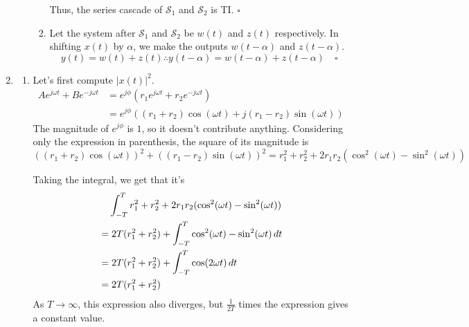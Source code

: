 \documentclass[12pt]{article}
\begin{document}
\begin{enumerate}
\begin{enumerate}
\begin{enumerate}
                                    Thus, the series cascade of $\mathcal{S}_1$ and $\mathcal{S}_2$ is TI. $\square$
                              \item Let the system after $\mathcal{S}_1$ and
                                    $\mathcal{S}_2$ be $w(t)$ and $z(t)$ respectively.
                                    In shifting $x(t)$ by $\alpha$, we make the outputs $w(t-\alpha)$ and $z(t-\alpha)$.
                                    \[y(t) = w(t) + z(t) \therefore y(t - \alpha) = w(t -\alpha) + z(t-\alpha)\quad\square\]
                        \end{enumerate}
            \end{enumerate}
      \item \begin{enumerate}
                  \item Let's first compute $|x(t)|^2$.
                        \begin{align*}
                              Ae^{j\omega t}+Be^{-j\omega t}
                               & = e^{j\phi}\left(r_1e^{j\omega t}+r_2e^{-j\omega t}\right)               \\
                               & = e^{j\phi}\left((r_1+r_2)\cos(\omega t)+j(r_1-r_2)\sin(\omega t)\right)
                        \end{align*}
                        The magnitude of $e^{j\phi}$ is $1$, so it doesn't contribute anything.
                        Considering only the expression in parenthesis,
                        the square of its magnitude is
                        \[((r_1+r_2)\cos(\omega t))^2+((r_1-r_2)\sin(\omega t))^2
                              = r_1^2+r_2^2 + 2r_1r_2(\cos^2(\omega t)-\sin^2(\omega t))\]

                        Taking the integral, we get that it's
                        \begin{align*}
                              &\hphantom{={}} \int_{-T}^T r_1^2+r_2^2+2r_1r_2(\cos^2(\omega t)-\sin^2(\omega t)) \\
                              &= 2T(r_1^2+r_2^2)+\int_{-T}^{T} \cos^2(\omega t)-\sin^2(\omega t)\,dt \\
                              &= 2T(r_1^2+r_2^2)+\int_{-T}^{T} \cos(2\omega t)\,dt \\
                              &= 2T(r_1^2+r_2^2)
                        \end{align*}
                        As $T \to \infty$, this expression also diverges,
                        but $\frac{1}{2T}$ times the expression gives a constant value.


\end{enumerate}
\end{enumerate}
\end{document}
